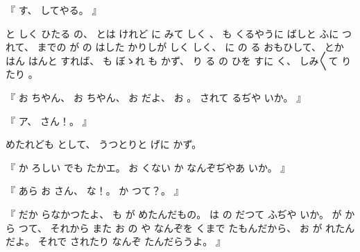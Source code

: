 %
『
す、
%
してやる。
』

%
と
しく
ひたる
の、
%
とは
けれど
に
みて
しく
、
%
%
も
くるやうに
ばしと
ふに
つれて、
%
までの
が
の
はした
かりしが
しく
しく、
%
に
の
る
おもひして、
%
とか
はん
はんと
すれば、
%
も
ぼゝれ%
も
かず、
%
%
り
る
の
ひを
すに
く、
%
しみ〳〵て
りたり
。

%
『
お
ちやん、
%
お
ちやん、
%
お
だよ、
%
お
。
%
されて%
るぢや
いか。
』

%
『
ア、
%
さん！。
』

%
めたれども
として、
%
うつとりと
げに
かず。

%
『
か
ろしい
でも
たかエ。
%
お
くない
か
なんぞぢやあ
いか。
』

%
『
あら
お
さん、
%
な！。
%
か
つて？。
』

%
『
だか
らなかつたよ、
%
も
が
めたんだもの。
%
は
の
だつて
ふぢや
いか。
%
が
から
つて、
%
それから
また
お
の
や
なんぞを
くまで
たもんだから、
%
お
が
れたんだよ。
%
それで
されたり
なんぞ
たんだらうよ。
』

